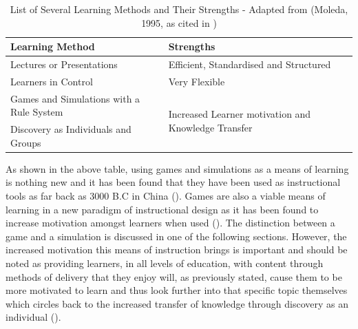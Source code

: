 \begin{table}[H]
\caption{List of Several Learning Methods and Their Strengths - Adapted from (Moleda, 1995, as cited in \cite{Reigeluth1996})}
\begin{tabular}{@{}l|l@{}}
\toprule
Learning Method                          & Strengths                                                            \\ \midrule
Lectures or Presentations                & Efficient, Standardised and   Structured                             \\
Learners in Control                      & Very Flexible                                                        \\
Games and Simulations with a Rule System & \multirow{2}{*}{Increased Learner motivation and Knowledge Transfer} \\
Discovery as Individuals and Groups      &                                                                      \\ \bottomrule
\end{tabular}
\end{table}

As shown in the above table, using games and simulations as a means of learning is nothing new and it has been found that they have been used as instructional tools as far back as 3000 B.C in China (\cite{Dempsey1996}). Games are also a viable means of learning in a new paradigm of instructional design as it has been found to increase motivation amongst learners when used (\cite{Reigeluth1996}). The distinction between a game and a simulation is discussed in one of the following sections. However, the increased motivation this means of instruction brings is important and should be noted as providing learners, in all levels of education, with content through methods of delivery that they enjoy will, as previously stated, cause them to be more motivated to learn and thus look further into that specific topic themselves which circles back to the increased transfer of knowledge through discovery as an individual (\cite{Ackoff2008, Reigeluth1996}).

